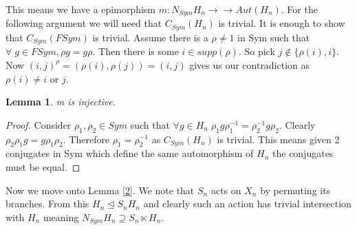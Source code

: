 \documentclass[a4paper,10pt]{article}
\theoremstyle{plain}%
\newtheorem{lem}[thm]{Lemma}
\theoremstyle{definition}
\theoremstyle{remark}
\begin{document}
This means we have a epimorphism $m: N_{Sym}H_n \xrightarrow\!\!\!\!\to Aut(H_n)$. For the following argument we will need that $C_{Sym}(H_n)$ is trivial. It is enough to show that $C_{Sym}(FSym)$ is trivial.
Assume there is a $\rho \ne 1$ in Sym such that $\forall \; g \in FSym, \rho g=g\rho$. Then there is some $i \in supp(\rho)$. So pick $j \not\in \{\rho(i), i\}$. Now $(i, j)^{\rho}=(\rho(i), \rho(j))=(i, j)$ gives us our contradiction
as $\rho(i)\ne i$ or $j$.
\begin{lem} m is injective.
\end{lem}
\begin{proof}
Consider $\rho_1, \rho_2 \in Sym$ such that $\forall g \in H_n\; \rho_1g\rho_1^{-1}=\rho_2^{-1}g\rho_2$. Clearly $\rho_2\rho_1g =g\rho_1\rho_2$. Therefore $\rho_1=\rho_2^{-1}$ as $C_{Sym}(H_n)$ is trivial.
This means given 2 conjugates in Sym which define the same automorphism of $H_n$ the conjugates must be equal.
\end{proof}
Now we move onto Lemma \ref{2}. We note that $S_n$ acts on $X_n$ by permuting its branches. From this $H_n \unlhd S_nH_n$ and clearly such an action has trivial intersection with $H_n$ meaning $N_{Sym}H_n \supseteq
S_n \ltimes H_n$.



\end{document}
